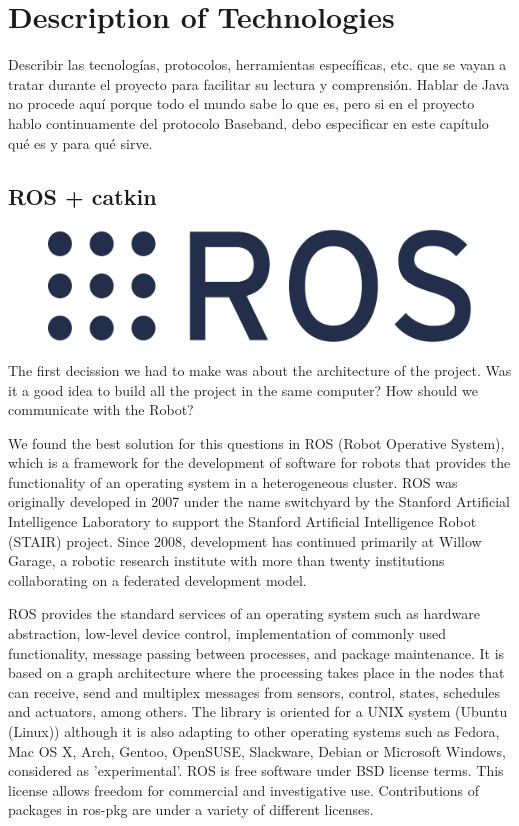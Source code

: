 \chapter{Description of Technologies}
	Describir las tecnologías, protocolos, herramientas específicas, etc. que se vayan a tratar durante el proyecto para facilitar su lectura y comprensión.
	Hablar de Java no procede aquí porque todo el mundo sabe lo que es, pero si en el proyecto hablo continuamente del protocolo Baseband, debo especificar en este capítulo qué es y para qué sirve.

	\section{ROS + catkin}  %
	
		\begin{figure}[h!]
			\centering
			\includegraphics[width=0.7\linewidth]{Images/logos/ros}
			\label{fig:ros}
		\end{figure}

		
			The first decission we had to make was about the architecture of the project. Was it a good idea to build all the project in the same computer? How should we communicate with the Robot?

		We found the best solution for this questions in ROS (Robot Operative System), which is a framework for the development of software for robots that provides the functionality of an operating system in a heterogeneous cluster. ROS was originally developed in 2007 under the name switchyard by the Stanford Artificial Intelligence Laboratory to support the Stanford Artificial Intelligence Robot (STAIR) project. Since 2008, development has continued primarily at Willow Garage, a robotic research institute with more than twenty institutions collaborating on a federated development model.

		ROS provides the standard services of an operating system such as hardware abstraction, low-level device control, implementation of commonly used functionality, message passing between processes, and package maintenance. It is based on a graph architecture where the processing takes place in the nodes that can receive, send and multiplex messages from sensors, control, states, schedules and actuators, among others. The library is oriented for a UNIX system (Ubuntu (Linux)) although it is also adapting to other operating systems such as Fedora, Mac OS X, Arch, Gentoo, OpenSUSE, Slackware, Debian or Microsoft Windows, considered as 'experimental'.
		ROS is free software under BSD license terms. This license allows freedom for commercial and investigative use. Contributions of packages in ros-pkg are under a variety of different licenses.

